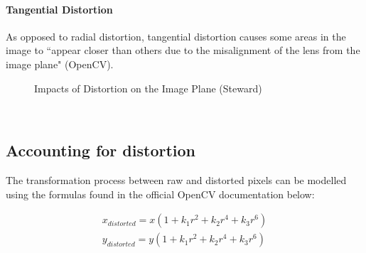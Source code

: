 \documentclass[11pt]{scrartcl}
\begin{document}
\paragraph{Tangential Distortion}
    As opposed to radial distortion, tangential distortion causes some areas in the image to ``appear closer than others due to the misalignment of the lens from the image plane" (OpenCV). 
\\
\begin{figure}[!htb]
    \centering
    \qquad
    \label{fig:example}%
    \caption{Impacts of Distortion on the Image Plane (Steward)}
\end{figure}
\\ 

\subsection{Accounting for distortion}

The transformation process between raw and distorted pixels can be modelled using the 
formulas found in the official OpenCV documentation below: 

\begin{theorem}
    \begin{align}
    x_{distorted} = x( 1 + k_1 r^2 + k_2 r^4 + k_3 r^6) 
    \\ y_{distorted} = y( 1 + k_1 r^2 + k_2 r^4 + k_3 r^6)    
    \end{align}
    
\end{theorem}
\end{document}
